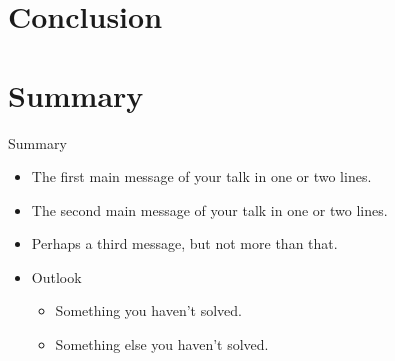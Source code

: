 \documentclass[xcolor=dvipsnames]{beamer}
\begin{document}
\section{Conclusion}
\section*{Summary}

\begin{frame}{Summary}
  \begin{itemize}
  \item
    The \alert{first main message} of your talk in one or two lines.
  \item
    The \alert{second main message} of your talk in one or two lines.
  \item
    Perhaps a \alert{third message}, but not more than that.
  \end{itemize}

  \begin{itemize}
  \item
    Outlook
    \begin{itemize}
    \item
      Something you haven't solved.
    \item
      Something else you haven't solved.
    \end{itemize}
  \end{itemize}
\end{frame}



\appendix
\end{document}
